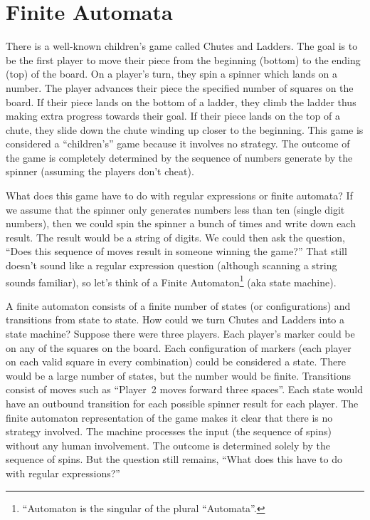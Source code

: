 \documentclass[letterpaper,12pt,openany,reqno]{book}%
\begin{document}
\chapter{Finite Automata}
There is a well-known children's game called Chutes and Ladders. The goal is to be the first player to move their piece from the beginning (bottom) to the ending (top) of the board. On a player's turn, they spin a spinner which lands on a number. The player advances their piece the specified number of squares on the board. If their piece lands on the bottom of a ladder, they climb the ladder thus making extra progress towards their goal. If their piece lands on the top of a chute, they slide down the chute winding up closer to the beginning. This game is considered a ``children's'' game because it involves no strategy. The outcome of the game is completely determined by the sequence of numbers generate by the spinner (assuming the players don't cheat).

What does this game have to do with regular expressions or finite automata? If we assume that the spinner only generates numbers less than ten (single digit numbers), then we could spin the spinner a bunch of times and write down each result. The result would be a string of digits. We could then ask the question, ``Does this sequence of moves result in someone winning the game?'' That still doesn't sound like a regular expression question (although scanning a string sounds familiar), so let's think of a Finite Automaton\footnote{``Automaton is the singular of the plural ``Automata''.} (aka state machine).

A finite automaton consists of a finite number of states (or configurations) and transitions from state to state. How could we turn Chutes and Ladders into a state machine? Suppose there were three players. Each player's marker could be on any of the squares on the board. Each configuration of markers (each player on each valid square in every combination) could be considered a state. There would be a large number of states, but the number would be finite. Transitions consist of moves such as ``Player~2 moves forward three spaces''. Each state would have an outbound transition for each possible spinner result for each player. The finite automaton representation of the game makes it clear that there is no strategy involved. The machine processes the input (the sequence of spins) without any human involvement. The outcome is determined solely by the sequence of spins. But the question still remains, ``What does this have to do with regular expressions?''
\end{document}
